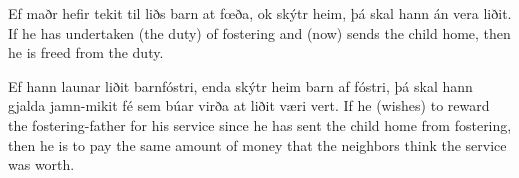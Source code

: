 \begin{paracol}{2}
    Ef maðr hefir tekit til liðs barn at fœða, ok skýtr heim, þá skal hann án vera liðit.
    \switchcolumn
    If he has undertaken (the duty) of fostering and (now) sends the child home, then he is freed from the duty.
\end{paracol}

\begin{paracol}{2}
    Ef hann launar liðit barnfóstri, enda skýtr heim barn af fóstri, þá skal hann gjalda jamn-mikit fé sem búar virða at liðit væri vert.
    \switchcolumn
    If he (wishes) to reward the fostering-father for his service since he has sent the child home from fostering, then he is to pay the same amount of money that the neighbors think the service was worth.
\end{paracol}


